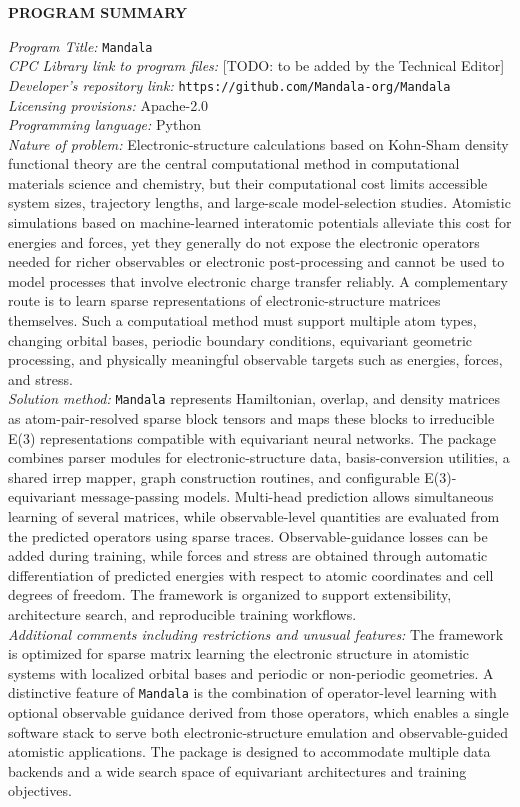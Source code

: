 {\bf PROGRAM SUMMARY}

\begin{small}
\noindent
{\em Program Title:} \texttt{Mandala} \\
{\em CPC Library link to program files:} [TODO: to be added by the Technical Editor] \\
{\em Developer's repository link:} \texttt{https://github.com/\texttt{Mandala}-org/\texttt{Mandala}} \\
{\em Licensing provisions:} Apache-2.0 \\
{\em Programming language:} Python \\
{\em Nature of problem:} Electronic-structure calculations based on Kohn-Sham density functional theory are the central computational method in computational materials science and chemistry, but their computational cost limits accessible system sizes, trajectory lengths, and large-scale model-selection studies. Atomistic simulations based on machine-learned interatomic potentials alleviate this cost for energies and forces, yet they generally do not expose the electronic operators needed for richer observables or electronic post-processing and cannot be used to model processes that involve electronic charge transfer reliably. A complementary route is to learn sparse representations of electronic-structure matrices themselves. Such a computatioal method must support multiple atom types, changing orbital bases, periodic boundary conditions, equivariant geometric processing, and physically meaningful observable targets such as energies, forces, and stress. \\
{\em Solution method:} \texttt{Mandala} represents Hamiltonian, overlap, and density matrices as atom-pair-resolved sparse block tensors and maps these blocks to irreducible E(3) representations compatible with equivariant neural networks. The package combines parser modules for electronic-structure data, basis-conversion utilities, a shared irrep mapper, graph construction routines, and configurable E(3)-equivariant message-passing models. Multi-head prediction allows simultaneous learning of several matrices, while observable-level quantities are evaluated from the predicted operators using sparse traces. Observable-guidance losses can be added during training, while forces and stress are obtained through automatic differentiation of predicted energies with respect to atomic coordinates and cell degrees of freedom. The framework is organized to support extensibility, architecture search, and reproducible training workflows. \\
{\em Additional comments including restrictions and unusual features:} The framework is optimized for sparse matrix learning the electronic structure in atomistic systems with localized orbital bases and periodic or non-periodic geometries. A distinctive feature of \texttt{Mandala} is the combination of operator-level learning with optional observable guidance derived from those operators, which enables a single software stack to serve both electronic-structure emulation and observable-guided atomistic applications. The package is designed to accommodate multiple data backends and a wide search space of equivariant architectures and training objectives.
\end{small}
